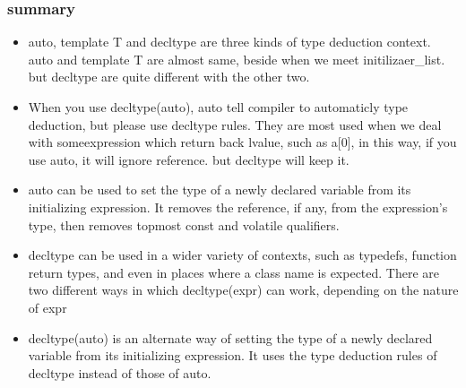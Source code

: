\documentclass[a4paper,12pt,twoside]{book}
\begin{document}
\subsubsection{summary}
\begin{itemize}
	\item auto, template T and decltype are three kinds of type deduction context. auto and template T are almost same, beside when we meet initilizaer\_list. but decltype are quite different with the other two. 
	
	\item When you use decltype(auto), auto tell compiler to automaticly type deduction, but please use decltype rules. They are most used when we deal with someexpression which return back lvalue, such as a[0], in this way, if you use auto, it will ignore reference. but decltype will keep it. 
	
	\item auto can be used to set the type of a newly declared variable from its initializing expression. It removes the reference, if any, from the expression's type, then removes topmost const and volatile qualifiers.
	
	\item decltype can be used in a wider variety of contexts, such as typedefs, function return types, and even in places where a class name is expected. There are two different ways in which decltype(expr) can work, depending on the nature of expr
	
	\item decltype(auto) is an alternate way of setting the type of a newly declared variable from its initializing expression. It uses the type deduction rules of decltype instead of those of auto.
	

\end{itemize}
\end{document}
